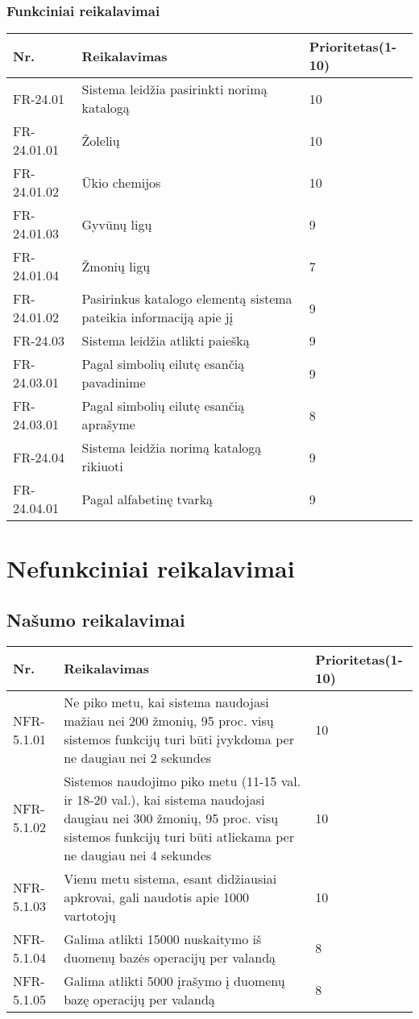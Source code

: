 \documentclass[oneside]{VUMIFPSkursinis}
\begin{document}
	\subsubsection{Funkciniai reikalavimai}
	\begin{table}[htbp]
		\begin{tabularx}{1\textwidth}{ |P{2.5cm}|X|P{3cm }| }  \hline
			Nr. & Reikalavimas & Prioritetas(1-10) \\ \hline
			FR-24.01 & Sistema leidžia pasirinkti norimą katalogą & 10 \\ \hline
			FR-24.01.01 & Žolelių & 10 \\ \hline
			FR-24.01.02 & Ūkio chemijos & 10 \\ \hline
			FR-24.01.03 & Gyvūnų ligų & 9 \\ \hline
			FR-24.01.04 & Žmonių ligų & 7 \\ \hline
			FR-24.01.02 & Pasirinkus katalogo elementą sistema pateikia informaciją apie jį & 9 \\ \hline
			FR-24.03 & Sistema leidžia atlikti paiešką  & 9 \\ \hline
			FR-24.03.01 & Pagal simbolių eilutę esančią pavadinime & 9 \\ \hline
			FR-24.03.01 & Pagal simbolių eilutę esančią aprašyme & 8 \\ \hline
			FR-24.04 & Sistema leidžia norimą katalogą rikiuoti & 9 \\ \hline
			FR-24.04.01 & Pagal alfabetinę tvarką  & 9 \\ \hline
		\end{tabularx}
	\end{table}

\section{Nefunkciniai reikalavimai}
\subsection{Našumo reikalavimai}
\begin{table}[htbp]
	\begin{tabularx}{1\textwidth}{ |P{2.5cm}|X|P{3cm }| }  \hline
		Nr. & Reikalavimas & Prioritetas(1-10) \\ \hline
		NFR-5.1.01 & Ne piko metu, kai sistema naudojasi mažiau nei 200 žmonių, 95 proc. visų sistemos funkcijų turi būti įvykdoma per ne daugiau nei 2 sekundes & 10 \\ \hline
		NFR-5.1.02 & Sistemos naudojimo piko metu (11-15 val. ir 18-20 val.), kai sistema naudojasi daugiau nei 300 žmonių, 95 proc. visų sistemos funkcijų turi būti atliekama per ne daugiau nei 4 sekundes & 10 \\ \hline
		NFR-5.1.03 & Vienu metu sistema, esant didžiausiai apkrovai, gali naudotis apie 1000 vartotojų & 10 \\ \hline
		NFR-5.1.04 & Galima atlikti 15000 nuskaitymo iš duomenų bazės operacijų per valandą & 8 \\ \hline
		NFR-5.1.05 & Galima atlikti 5000 įrašymo į duomenų bazę operacijų per valandą  & 8 \\ \hline
	\end{tabularx}
\end{table}
\end{document}
